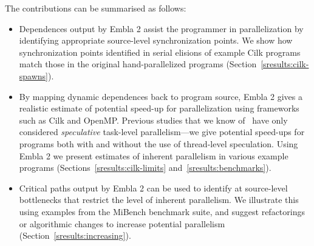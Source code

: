 The contributions can be summarised as follows:
\begin{itemize}
\item
Dependences output by Embla 2 assist the programmer in 
parallelization by identifying
appropriate source-level synchronization points. We show how synchronization
points identified in serial elisions of example Cilk programs
match those in the original hand-parallelized programs (Section~\ref{sresults:cilk-spawns}).
\item
By mapping dynamic dependences back to program source,
Embla 2 gives a realistic estimate of potential speed-up for
parallelization using frameworks such as Cilk and OpenMP.
Previous studies that we know of~\cite{Kreaseck00limitsof,warg01limits,oplinger99insearch}
have only considered \emph{speculative}
task-level parallelism---we give potential speed-ups for programs
both with and without the use of thread-level speculation.
Using Embla 2 we present estimates of inherent parallelism in
various example programs (Sections~\ref{sresults:cilk-limits} and~\ref{sresults:benchmarks}).
\item
Critical paths output by Embla 2 can
be used to identify at source-level bottlenecks that restrict the level of
inherent parallelism. We illustrate this using examples
from the MiBench benchmark suite, and suggest refactorings
or algorithmic changes to increase potential parallelism (Section~\ref{sresults:increasing}).
\end{itemize}
